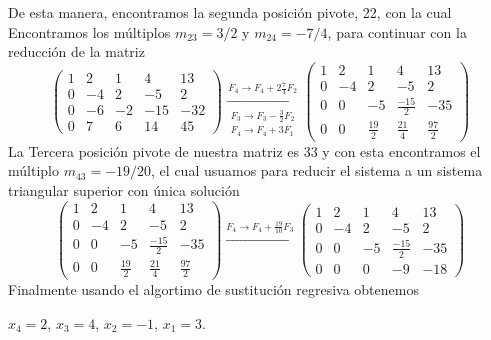 \documentclass[12pt]{book}
\begin{document}
    De esta manera, encontramos la segunda posición pivote, 22, con la cual Encontramos los múltiplos $m_{23} = 3/2$ y $m_{24}=-7/4$, para continuar con la reducción de la matriz
    \begin{equation*}
    \left(
        \begin{array}{rrrr|r}
            1 & 2 & 1 & 4 & 13 \\ 
            0 & -4 & 2 & -5 & 2 \\ 
            0 & -6 & -2 & -15 & -32 \\ 
            0 & 7 & 6 & 14 & 45 
        \end{array} \right)
        \xrightarrow[\substack{F_{3} \to F_{3}-\frac{3}{2}F_{2} \\ F_4 \to F_4+3F_1}]{F_{4} \to F_{4} +2\frac{7}{4}F_{2}}
    \left(
        \begin{array}{rrrr|r}
            1 & 2 & 1 & 4 & 13 \\ 
            0 & -4 & 2 & -5 & 2 \\ 
            0 & 0 & -5 & \frac{-15}{2} & -35 \\ 
            0 & 0 & \frac{19}{2} & \frac{21}{4} & \frac{97}{2}
        \end{array} \right)
    \end{equation*}
    La Tercera posición pivote de nuestra matriz es 33 y con esta encontramos el múltiplo $m_{43}=-19/20$, el cual usuamos para reducir el sistema a un sistema triangular superior con única solución
    \begin{equation*}
    \left(
        \begin{array}{rrrr|r}
            1 & 2 & 1 & 4 & 13 \\ 
            0 & -4 & 2 & -5 & 2 \\ 
            0 & 0 & -5 & \frac{-15}{2} & -35 \\ 
            0 & 0 & \frac{19}{2} & \frac{21}{4} & \frac{97}{2}
        \end{array} \right)
        \xrightarrow[\substack{}]{F_{4} \to F_{4} +\frac{19}{10}F_{3}}
    \left(
        \begin{array}{rrrr|r}
            1 & 2 & 1 & 4 & 13 \\ 
            0 & -4 & 2 & -5 & 2 \\ 
            0 & 0 & -5 & \frac{-15}{2} & -35 \\ 
            0 & 0 & 0 & -9 & -18
        \end{array} \right)
    \end{equation*}
    Finalmente usando el algortimo de sustitución regresiva obtenemos 
    \begin{center}
        $x_{4}=2$, \vspace{2pt} $x_{3}=4$, \vspace{2pt} $x_{2}=-1$, \vspace{2pt} $x_{1}=3$.
    \end{center}
\end{document}
